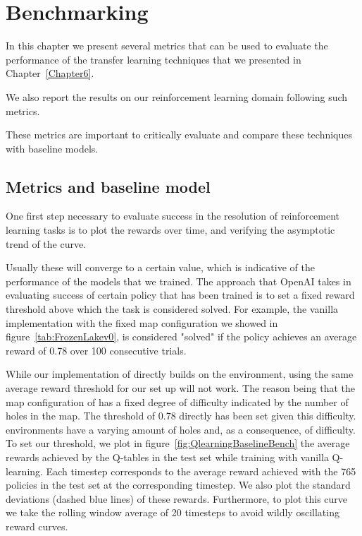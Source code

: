 
\chapter{Benchmarking}
\label{Chapter7}

In this chapter we present several metrics that can be used to evaluate the performance of the transfer learning techniques that we presented in Chapter~\ref{Chapter6}.

We also report the results on our reinforcement learning domain following such metrics.

These metrics are important to critically evaluate and compare these techniques with baseline models.




\section{Metrics and baseline model}
\label{sec:metricsbaselinemodel}
One first step necessary to evaluate success in the resolution of reinforcement learning tasks is to plot the rewards over time, and verifying the asymptotic trend of the curve.

Usually these will converge to a certain value, which is indicative of the performance of the models that we trained. The approach that OpenAI takes in evaluating success of certain policy that has been trained is to set a fixed reward threshold above which the task is considered solved. For example, the vanilla  implementation with the fixed map configuration we showed in figure~\ref{tab:FrozenLakev0}, is considered "solved" if the policy achieves an average reward of 0.78 over 100 consecutive trials.

While our implementation of  directly builds on the  environment, using the same average reward threshold for our set up will not work. The reason being that the map configuration of  has a fixed degree of difficulty indicated by the number of holes in the map. The threshold of 0.78 directly has been set given this difficulty.
 environments have a varying amount of holes and, as a consequence, of difficulty. To set our threshold, we plot in figure~\ref{fig:QlearningBaselineBench} the average rewards achieved by the Q-tables in the test set while training with vanilla Q-learning. Each timestep corresponds to the average reward achieved with the 765 policies in the test set at the corresponding timestep. We also plot the standard deviations (dashed blue lines) of these rewards. Furthermore, to plot this curve we take the rolling window average of 20 timesteps to avoid wildly oscillating reward curves.

